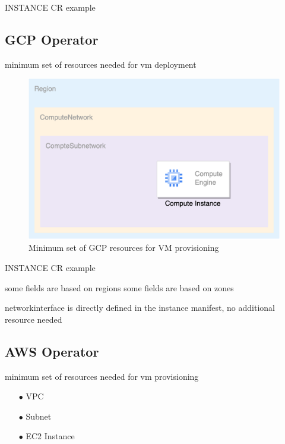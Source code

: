 INSTANCE CR example











\subsection{GCP Operator}

minimum set of resources needed for vm deployment


\begin{figure}[htb]
\centering
\includegraphics[width=0.75\linewidth]{images/gcp.png}
\caption{Minimum set of GCP resources for VM provisioning}
\label{fig:gcp}
\end{figure}




INSTANCE CR example

some fields are based on regions
some fields are based on zones


networkinterface is directly defined in the instance manifest,
no additional resource needed



\subsection{AWS Operator}

minimum set of resources needed for vm provisioning

\begin{itemize}[itemsep=0.2pt, topsep=1pt] \item[$\bullet$] VPC
\item[$\bullet$] Subnet
\item[$\bullet$] EC2 Instance
\end{itemize}






